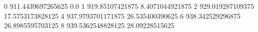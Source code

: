 0 911.4439697265625 0.0
1 919.85107421875 8.4071044921875
2 929.019287109375 17.5753173828125
4 937.9793701171875 26.535400390625
6 938.342529296875 26.8985595703125
8 939.5362548828125 28.09228515625
